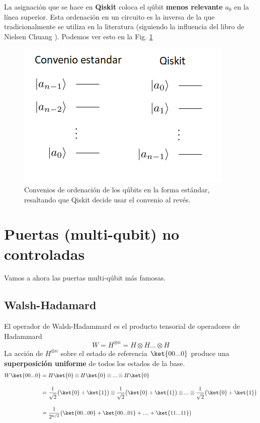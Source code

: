 \documentclass[a4paper,11pt]{book} %
\numberwithin{equation}{chapter}
\begin{document}
La asignación que se hace en \textbf{Qiskit }coloca el qúbit \textbf{menos relevante }$a_0$  en la  línea superior. Esta ordenación en un circuito es la inversa de la que tradicionalmente se utiliza en la literatura (siguiendo la influencia del libro de Nielsen Chuang \cite{bib_nielsen_chuang_2010}). Podemos ver esto en la Fig. \ref{Fig_multiqubits_convenios_ordenacion}

	\begin{figure}[H]
	\centering 
	\includegraphics[width=0.4\linewidth]{Figuras/Fig_multiqubits_convenios_ordenacion.png}
	\caption{Convenios de ordenación de los qúbits en la forma estándar, resaltando que Qiskit decide usar el convenio al revés.}
	\label{Fig_multiqubits_convenios_ordenacion}
	\end{figure}


    \section{Puertas (multi-qubit) no controladas}

Vamos a ahora las puertas multi-qúbit más famosas.
   

        \subsection{Walsh-Hadamard}
        
El operador de Walsh-Hadammard es el producto tensorial de operadores de Hadammard
\begin{equation}
W = H^{\otimes n} = H\otimes H \ldots \otimes H 
\end{equation}
La  acción  de $H^{\otimes n}$ sobre el estado de referencia $\ket{00...0}$ produce una \textbf{superposición uniforme} de todos los estados de la base.
	\begin{align*}
	W \ket{00...0} &= H\ket{0}\otimes H\ket{0} \otimes ... \otimes H\ket{0} \\  \rule{0mm}{8mm}
	& = \frac{1}{\sqrt{2}}\big(\ket{0}+\ket{1}\big)\otimes \frac{1}{\sqrt{2}}\big(\ket{0}+\ket{1}\big)\otimes ...\otimes \frac{1}{\sqrt{2}}\big(\ket{0}+\ket{1}\big)\\ \rule{0mm}{8mm}
	&= \frac{1}{2^{n/2}}\big(\ket{00...00} + \ket{00...01}+....+\ket{11...11} \big)
	\end{align*}
\end{document}
